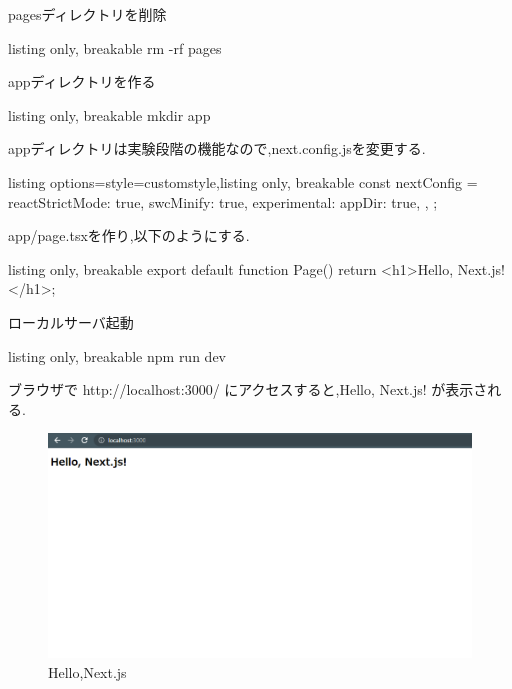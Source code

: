 pagesディレクトリを削除
\begin{tcblisting}{listing only, breakable}
  rm -rf pages
\end{tcblisting}

appディレクトリを作る
\begin{tcblisting}{listing only, breakable}
  mkdir app
\end{tcblisting}


appディレクトリは実験段階の機能なので,next.config.jsを変更する.

\begin{tcblisting}{listing options={style=customstyle},listing only, breakable}
  const nextConfig = {
  reactStrictMode: true,
  swcMinify: true,
  experimental: {
  appDir: true,
  },
  };
\end{tcblisting}

app/page.tsxを作り,以下のようにする.



\begin{tcblisting}{listing only, breakable}
  export default function Page() {
      return <h1>Hello, Next.js!</h1>;
    }
\end{tcblisting}




ローカルサーバ起動


\begin{tcblisting}{listing only, breakable}
  npm run dev
\end{tcblisting}



ブラウザで http://localhost:3000/ にアクセスすると,Hello, Next.js! が表示される.

\begin{figure}[H]
  \centering
  \includegraphics[width=12cm]{./image/03-Tech/chap4/01.png}
  \caption{Hello,Next.js}

\end{figure}




